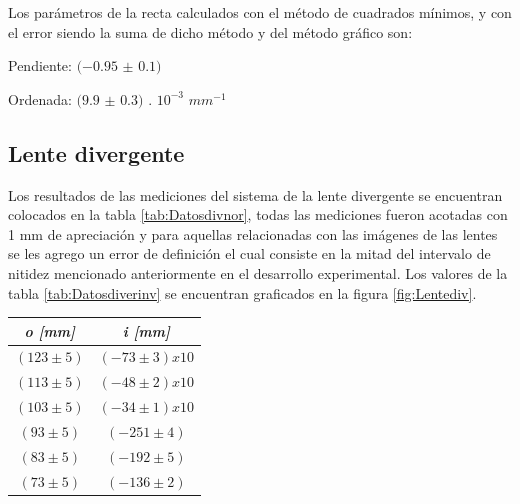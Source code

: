 \documentclass[a4paper,12pt]{article}
\newenvironment{Figure}
  {\par\medskip\noindent\minipage{\linewidth}}
  {\endminipage\par\medskip}
\begin{document}
\begin{multicols*}{2}
        Los parámetros de la recta calculados con el método de cuadrados mínimos, y con el error siendo la suma de dicho método y del método gráfico son:

        Pendiente: $(-0.95$ $\pm$ $0.1)$

        Ordenada: $(9.9$ $\pm$ $0.3)$ . $10^{-3}$ $mm^{-1}$

    \subsection*{Lente divergente}

        Los resultados de las mediciones del sistema de la lente divergente se encuentran colocados en la tabla \ref{tab:Datosdivnor}, todas las mediciones fueron acotadas con 1 mm de apreciación y para aquellas relacionadas con las imágenes de las lentes se les agrego un error de definición el cual consiste en la mitad del intervalo de nitidez mencionado anteriormente en el desarrollo experimental. Los valores de la tabla \ref{tab:Datosdiverinv} se encuentran graficados en la figura \ref{fig:Lentediv}.

        \begin{Figure}
            \centering

            \begin{tabular}{cc}
                \toprule
                \multicolumn{1}{c}{\textit{\textbf{o [mm]}}} & \textit{\textbf{i [mm]}} \\
                \midrule
                $(123 \pm 5)$ & $(-73 \pm 3)x10 $\\
                $(113 \pm 5)$ & $(-48 \pm 2)x10$ \\
                $(103 \pm 5)$ & $(-34 \pm 1)x10$ \\
                $(93 \pm 5)$ & $(-251 \pm 4)$ \\
                $(83 \pm 5)$& $(-192 \pm 5)$ \\
                $(73 \pm 5)$ & $(-136 \pm 2)$ \\
                \bottomrule
            \end{tabular}

            \label{tab:Datosdivnor}
        \end{Figure} 

        \begin{Figure}
            \centering


\end{Figure}
\end{multicols*}
\end{document}
